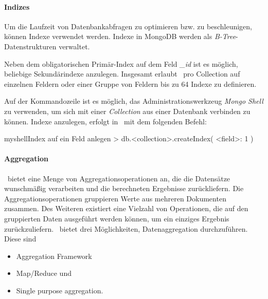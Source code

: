 \paragraph{Indizes}
Um die Laufzeit von Datenbankabfragen zu optimieren bzw. zu beschleunigen, können Indexe verwendet werden. Indexe in MongoDB werden als \textit{B-Tree}-Datenstrukturen \cite{b-tree} verwaltet.

Neben dem obligatorischen Primär-Index auf dem Feld \textit{\_id} ist es möglich, beliebige Sekundärindexe anzulegen. Insgesamt erlaubt \mongo\, pro Collection auf einzelnen Feldern oder einer Gruppe von Feldern bis zu 64 Indexe zu definieren.

Auf der Kommandozeile ist es möglich, das Administrationswerkzeug \textit{Mongo Shell} zu verwenden, um sich mit einer \textit{Collection} aus einer Datenbank verbinden zu können. Indexe anzulegen, erfolgt in \mongo\ mit dem folgenden Befehl: 
\begin{listingsboxShell}[label={lst:createIndex}]{myshell}{Index auf ein Feld anlegen}
> db.<collection>.createIndex( {<field>: 1} )
\end{listingsboxShell}

\paragraph{Aggregation}\label{aggr}
\mongo\ bietet eine Menge von Aggregationsoperationen an, die die Datensätze wunschmäßig verarbeiten und die berechneten Ergebnisse zurückliefern. Die Aggregationsoperationen gruppieren Werte aus mehreren Dokumenten zusammen. Des Weiteren existiert eine Vielzahl von Operationen, die auf den gruppierten Daten ausgeführt werden können, um ein einziges Ergebnis zurückzuliefern. \mongo\ bietet drei Möglichkeiten, Datenaggregation durchzuführen. Diese sind 
\begin{itemize}
\item Aggregation Framework
\item Map/Reduce und
\item Single purpose aggregation.\cite{aggr}
\end{itemize}

